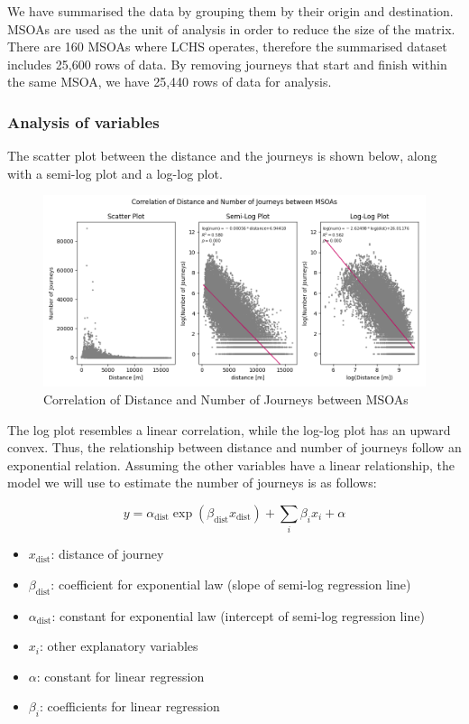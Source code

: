 \documentclass[
  12pt,
  a4paper,
  DIV=11,
  numbers=noendperiod]{scrartcl}
\providecommand{\tightlist}{%
  \setlength{\itemsep}{0pt}\setlength{\parskip}{0pt}}\usepackage{longtable,booktabs,array}
\begin{document}
We have summarised the data by grouping them by their origin and
destination. MSOAs are used as the unit of analysis in order to reduce
the size of the matrix. There are 160 MSOAs where LCHS operates,
therefore the summarised dataset includes 25,600 rows of data. By
removing journeys that start and finish within the same MSOA, we have
25,440 rows of data for analysis.

\hypertarget{analysis-of-variables}{%
\subsubsection{Analysis of variables}\label{analysis-of-variables}}

The scatter plot between the distance and the journeys is shown below,
along with a semi-log plot and a log-log plot.

\begin{figure}

{\centering \includegraphics{img/scatter_MSOA.png}

}

\caption{Correlation of Distance and Number of Journeys between MSOAs}

\end{figure}

The log plot resembles a linear correlation, while the log-log plot has
an upward convex. Thus, the relationship between distance and number of
journeys follow an exponential relation. Assuming the other variables
have a linear relationship, the model we will use to estimate the number
of journeys is as follows:

\[
y = \alpha_\text{dist} \exp(\beta_\text{dist} x_\text{dist}) + \sum_i{\beta_ix_i} + \alpha
\]

\begin{itemize}
\tightlist
\item
  \(x_{\text{dist}}\): distance of journey
\item
  \(\beta_\text{dist}\): coefficient for exponential law (slope of
  semi-log regression line)
\item
  \(\alpha_\text{dist}\): constant for exponential law (intercept of
  semi-log regression line)
\item
  \(x_i\): other explanatory variables
\item
  \(\alpha\): constant for linear regression
\item
  \(\beta_i\): coefficients for linear regression
\end{itemize}
\end{document}
